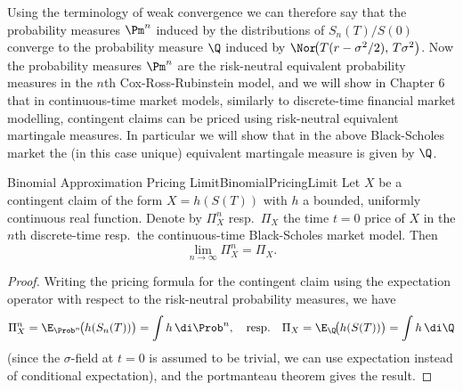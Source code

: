 Using the terminology of weak convergence we can therefore say that the probability measures
\(\Pm^n\) induced by the distributions of \(S_n(T)/S(0)\) converge to the probability measure
\(\Q\) induced by \(\Nor\!\big(T(r-\sigma^2/2),\,T\sigma^2\big)\). Now the probability measures
\(\Pm^n\) are the risk-neutral equivalent probability measures in the \(n\)th Cox-Ross-Rubinstein
model, and we will show in Chapter 6 that in continuous-time market models, similarly to discrete-time
financial market modelling, contingent claims can be priced using risk-neutral equivalent martingale
measures. In particular we will show that in the above Black-Scholes market the (in this case unique)
equivalent martingale measure is given by \(\Q\).

\begin{prop}{Binomial Approximation Pricing Limit}{BinomialPricingLimit}
	Let $X$ be a contingent claim of the form $X = h(S(T))$ with $h$ a bounded, uniformly continuous real function. Denote by $\Pi_X^n$ resp.\ $\Pi_X$ the time $t = 0$ price of $X$ in the $n$th discrete-time resp.\ the continuous-time Black-Scholes market model. Then
	\[
		\lim_{n\to\infty} \Pi_X^n = \Pi_X.
	\]
\end{prop}
\begin{proof}
	Writing the pricing formula for the contingent claim using the expectation operator with respect to the risk-neutral probability measures, we have
	\[
		\Pi_X^n = \E_{\Prob^n}\!\big(h(S_n(T))\big) = \int h \,\di \Prob^n,
		\quad \text{resp.} \quad
		\Pi_X = \E_{\Q}\!\big(h(S(T))\big) = \int h \,\di \Q
	\]
	(since the $\sigma$-field at $t = 0$ is assumed to be trivial, we can use expectation instead of conditional expectation), and the portmanteau theorem gives the result.
\end{proof}
